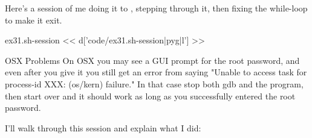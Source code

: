 \begin{enumerate}
Here's a session of me doing it to , stepping through it, then
fixing the while-loop to make it exit.

\begin{code}{ex31.sh-session}
<< d['code/ex31.sh-session|pyg|l'] >>
\end{code}

\begin{aside}{OSX Problems}
On OSX you may see a GUI prompt for the root password, and even after you
give it you still get an error from  saying "Unable to access task for process-id XXX: (os/kern) failure."  In that case stop both gdb and the
 program, then start over and it should work as long as you
successfully entered the root password.
\end{aside}

I'll walk through this session and explain what I did:


\end{enumerate}
